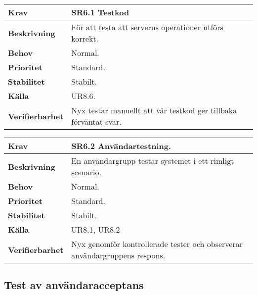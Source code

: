 \documentclass[a4paper, twoside, 11pt, titlepage]{article}
\begin{document}
\begin{tabular} { p{2.6cm} p{12.5cm} }
	\hline
	\sffamily\textbf{Krav} & \sffamily\textbf{SR6.1 Testkod } \\
	\hline
	\sffamily\textbf{Beskrivning} &  För att testa att serverns operationer utförs korrekt.  \\
	\hline
	\sffamily\textbf{Behov} &  Normal.  \\
	\hline
	\sffamily\textbf{Prioritet} &  Standard.  \\
	\hline
	\sffamily\textbf{Stabilitet} &  Stabilt.  \\
	\hline
	\sffamily\textbf{Källa} &  UR8.6.  \\
	\hline
	\sffamily\textbf{Verifierbarhet} &  Nyx testar manuellt att vår testkod ger tillbaka förväntat svar.  \\
	\hline
\end{tabular}
\vspace{6mm}

\begin{tabular} { p{2.6cm} p{12.5cm} }
	\hline
	\sffamily\textbf{Krav} & \sffamily\textbf{SR6.2 Användartestning. } \\
	\hline
	\sffamily\textbf{Beskrivning} &  En användargrupp testar systemet i ett rimligt scenario.  \\
	\hline
	\sffamily\textbf{Behov} &  Normal.  \\
	\hline
	\sffamily\textbf{Prioritet} &  Standard.  \\
	\hline
	\sffamily\textbf{Stabilitet} &  Stabilt.  \\
	\hline
	\sffamily\textbf{Källa} &  UR8.1, UR8.2  \\
	\hline
	\sffamily\textbf{Verifierbarhet} &  Nyx genomför kontrollerade tester och observerar användargruppens respons.  \\
	\hline
\end{tabular}


	\subsection{Test av användaracceptans}
\end{document}
